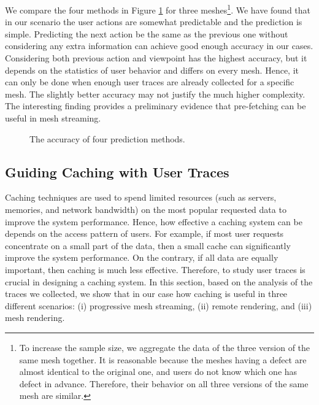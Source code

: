We compare the four methods in Figure \ref{f:user:accuracy_comp} for three meshes\footnote{
To increase the sample size, we aggregate the data of the three version of the same mesh together.
It is reasonable because the meshes having a defect are almost identical to the original one, 
and users do not know which one has defect in advance. Therefore, their behavior on 
all three versions of the same mesh are similar.}.
We have found that in our scenario the user actions are somewhat predictable and the prediction is simple.
Predicting the next action be the same as the previous one without considering
any extra information can achieve good enough accuracy in our cases. 
Considering both previous action and viewpoint has the highest accuracy,
but it depends on the statistics of user behavior and differs on every mesh. 
Hence, it can only be done when enough user traces are already collected for a specific mesh. 
The slightly better accuracy may not justify the much higher complexity.
The interesting finding provides a preliminary evidence that pre-fetching can be useful
in mesh streaming.
\begin{figure}
    \centering
    \caption{The accuracy of four prediction methods.}
    \label{f:user:accuracy_comp}
\end{figure}

\subsection{Guiding Caching with User Traces}
Caching techniques are used to spend limited resources (such as 
servers, memories, and network bandwidth) on the most popular requested 
data to improve the system performance. 
Hence, how effective a caching system can be depends on the access pattern
of users. For example, if most user requests concentrate on a small 
part of the data, then a small cache can significantly improve the 
system performance. On the contrary, if all data are equally important,
then caching is much less effective. Therefore, to study user traces
is crucial in designing a caching system.
In this section, based on the analysis of the traces we collected, 
we show that in our case how caching is useful in three different scenarios:
(i) progressive mesh streaming, (ii) remote rendering, and (iii) 
mesh rendering.

